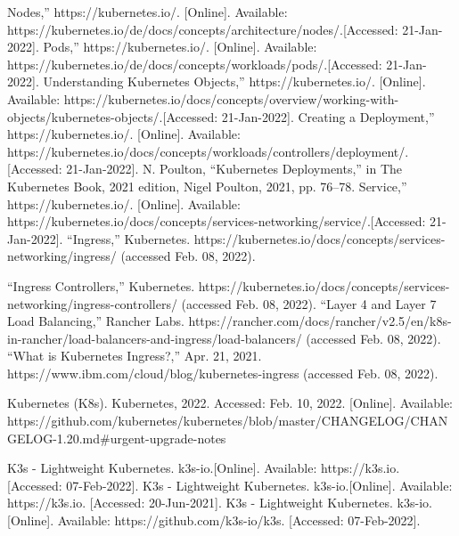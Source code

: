 \documentclass[12pt,oneside]{report}
\begin{document}
\begin{thebibliography}{10}
     Nodes,” https://kubernetes.io/. [Online]. 
    Available: https://kubernetes.io/de/docs/concepts/architecture/nodes/.[Accessed: 21-Jan-2022].
     Pods,” https://kubernetes.io/. [Online]. 
    Available: https://kubernetes.io/de/docs/concepts/workloads/pods/.[Accessed: 21-Jan-2022].
     Understanding Kubernetes Objects,” https://kubernetes.io/. [Online]. 
    Available: https://kubernetes.io/docs/concepts/overview/working-with-objects/kubernetes-objects/.[Accessed: 21-Jan-2022].  
     Creating a Deployment,” https://kubernetes.io/. [Online]. 
    Available: https://kubernetes.io/docs/concepts/workloads/controllers/deployment/.[Accessed: 21-Jan-2022].
     N. Poulton, “Kubernetes Deployments,” in The Kubernetes Book, 2021 edition, Nigel Poulton, 2021, pp. 76–78. 
     Service,” https://kubernetes.io/. [Online]. 
    Available: https://kubernetes.io/docs/concepts/services-networking/service/.[Accessed: 21-Jan-2022].
    “Ingress,” Kubernetes. https://kubernetes.io/docs/concepts/services-networking/ingress/ (accessed Feb. 08, 2022).

    “Ingress Controllers,” Kubernetes. https://kubernetes.io/docs/concepts/services-networking/ingress-controllers/ (accessed Feb. 08, 2022).
    “Layer 4 and Layer 7 Load Balancing,” Rancher Labs. https://rancher.com/docs/rancher/v2.5/en/k8s-in-rancher/load-balancers-and-ingress/load-balancers/ (accessed Feb. 08, 2022).
    “What is Kubernetes Ingress?,” Apr. 21, 2021. https://www.ibm.com/cloud/blog/kubernetes-ingress (accessed Feb. 08, 2022).


     Kubernetes (K8s). Kubernetes, 2022. Accessed: Feb. 10, 2022. [Online]. Available: https://github.com/kubernetes/kubernetes/blob/master/CHANGELOG/CHANGELOG-1.20.md\#urgent-upgrade-notes




     K3s - Lightweight Kubernetes. k3s-io.[Online]. Available: https://k3s.io. [Accessed: 07-Feb-2022].
     K3s - Lightweight Kubernetes. k3s-io.[Online]. Available: https://k3s.io. [Accessed: 20-Jun-2021].
     K3s - Lightweight Kubernetes. k3s-io.[Online]. Available: https://github.com/k3s-io/k3s. [Accessed: 07-Feb-2022].



\end{thebibliography}
\end{document}
